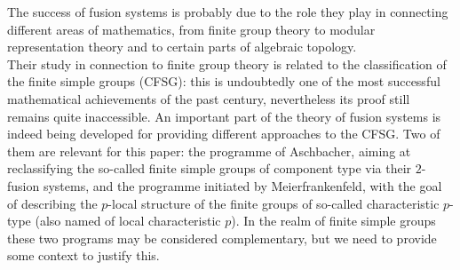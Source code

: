 \documentclass{amsart}
\numberwithin{equation}{section}
\theoremstyle{definition}
\theoremstyle{subresult}
\theoremstyle{caseresult}
\newcommand{\<}{\langle}
\renewcommand{\>}{\rangle}
\begin{document}
The success of fusion systems is probably due to the role they play in connecting different areas of mathematics, from finite group theory to modular representation theory and to certain parts of algebraic topology.\\
Their study in connection to finite group theory is related to the classification of the finite simple groups (CFSG): this is undoubtedly one of the most successful mathematical achievements of the past century, nevertheless its proof still remains quite inaccessible. An important part of the theory of fusion systems is indeed being developed for providing different approaches to the CFSG.   Two of them are relevant for this paper: the programme of Aschbacher, aiming at reclassifying the so-called finite simple groups of component type via their $2$-fusion systems, and the programme initiated by Meierfrankenfeld, with the goal of describing the $p$-local structure of the finite groups of so-called characteristic $p$-type (also named of local characteristic $p$). In the realm of finite simple groups these two programs may be considered complementary, but we need to provide some context to justify this.\\
\end{document}
